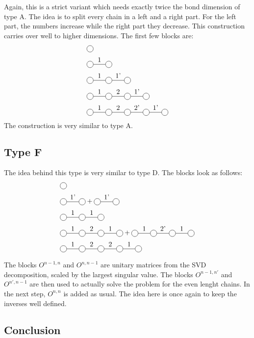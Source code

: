 Again, this is a strict variant which needs exactly twice the bond dimension of type A. The idea is to split every chain in a left and a right part. For the left part, the numbers increase while the right part they decrease. This construction carries over well to higher dimensions. The first few blocks are:
\begin{equation}
    \begin{split}
        &\mpob{1}{ {,}  }{}{}{}{{,,}} \\
        &\mpob{2}{ {,"1",}  }{}{}{}{{,,}}\\
        &\mpob{3}{ {,"1","1'",}  }{}{}{}{{,,,}}\\
        &\mpob{4}{ {,"1","2","1'",}  }{}{}{}{{,,,,,}}\\
        &\mpob{5}{ {,"1","2","2'","1'",}  }{}{}{}{{,,,,,}}\\
    \end{split}
\end{equation}
The construction is very similar to type A.

\subsection{Type F}

The idea behind this type is very similar to type D. The blocks look as follows:
\begin{equation}
    \begin{split}
        &\mpob{1}{ {,}  }{}{}{}{{,,}} \\
        &\mpob{2}{ {,"1'",}  }{}{}{}{{,,}}+\mpob{2}{ {,"1'",}  }{}{}{}{{,,}}\\
        &\mpob{3}{ {,"1","1",}  }{}{}{}{{,,,}}\\
        &\mpob{4}{ {,"1","2","1",}  }{}{}{}{{,,,,,}}+\mpob{4}{ {,"1","2'","1",}  }{}{}{}{{,,,,,}}\\
        &\mpob{5}{ {,"1","2","2","1",}  }{}{}{}{{,,,,,}}\\
    \end{split}
\end{equation}

The  blocks $O^{n-1,n}$ and $O^{n,n-1}$ are unitary matrices from the \Gls{SVD} decomposition, scaled by the largest singular value. The blocks $O^{n-1,n'}$ and $O^{n',n-1}$ are then used to actually solve the problem for the even lenght chains. In the next step, $O^{n,n}$ is added as usual. The idea here is once again to keep the inverses well defined.

\subsection{Conclusion}

